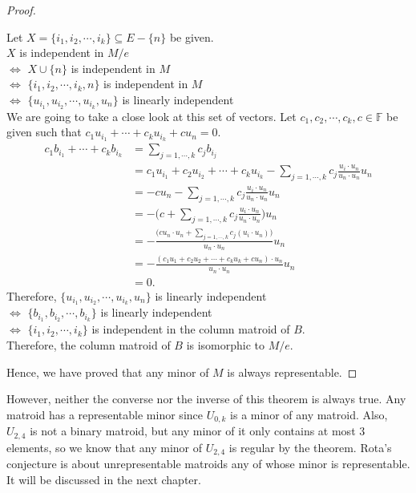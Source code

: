 \begin{proof}
\begin{enumerate}
  Let $X = \{ i_1, i_2, \cdots, i_k \} \subseteq E - \{ n \}$ be given. \\
  $X$ is independent in $M / e$ \\
  $\iff$ $X \cup \{ n \}$ is independent in $M$ \\
  $\iff$ $\{ i_1, i_2, \cdots, i_k, n \}$ is independent in $M$ \\
  $\iff$ $\{ u_{i_1}, u_{i_2}, \cdots, u_{i_k}, u_{n} \}$ is linearly independent \\
  We are going to take a close look at this set of vectors.
  Let $c_1, c_2, \cdots, c_k, c \in \mathbb{F}$ be given such that $c_1 u_{i_1} + \cdots + c_k u_{i_k} + c u_n = 0$.\\
  \begin{align*}\displaystyle c_1 b_{i_1} + \cdots + c_k b_{i_k}
  &= \sum_{j=1,\cdots,k} c_j b_{i_j}  \\
  &= c_1 u_{i_1} + c_2 u_{i_2} + \cdots + c_k u_{i_k} - \sum_{j=1,\cdots,k} c_j \frac{u_i \cdot u_n}{u_n \cdot u_n} u_n  \\
  &= -c u_n - \sum_{j=1,\cdots,k} c_j \frac{u_i \cdot u_n}{u_n \cdot u_n} u_n \\
  &= -\Big(c + \sum_{j=1,\cdots,k} c_j \frac{u_i \cdot u_n}{u_n \cdot u_n}\Big)u_n \\
  &= -\frac{\Big(c{u_n \cdot u_n} + \sum_{j=1,\cdots,k} c_j (u_i \cdot u_n)\Big)}{u_n \cdot u_n}u_n \\
  &= -\frac{(c_1 u_1 + c_2 u_2 + \cdots + c_k u_k + c u_n) \cdot u_n}{u_n \cdot u_n}u_n \\
  &= 0.\end{align*}
  Therefore, $\{ u_{i_1}, u_{i_2}, \cdots, u_{i_k}, u_{n} \}$ is linearly independent \\
  $\iff$ $\{ b_{i_1}, b_{i_2}, \cdots, b_{i_k} \}$ is linearly independent \\
  $\iff$ $\{ i_1, i_2, \cdots, i_k \}$ is independent in the column matroid of $B$. \\
  Therefore, the column matroid of $B$ is isomorphic to $M / e$.
\end{enumerate}
Hence, we have proved that any minor of $M$ is always representable.
\end{proof}

However, neither the converse nor the inverse of this theorem is always true.
Any matroid has a representable minor since $U_{0, k}$ is a minor of any matroid.
Also, $U_{2, 4}$ is not a binary matroid, but any minor of it only contains at most 3 elements, so we know that any minor of $U_{2,4}$ is regular by the theorem.
Rota's conjecture is about unrepresentable matroids any of whose minor is representable.
It will be discussed in the next chapter.


